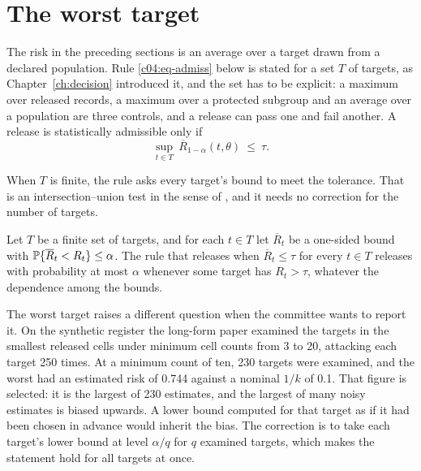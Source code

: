 \section{The worst target}

The risk in the preceding sections is an average over a target drawn from a declared
population. Rule \eqref{c04:eq-admiss} below is stated for a set $T$ of targets, as
Chapter~\ref{ch:decision} introduced it, and the set has to be explicit: a maximum over released
records, a maximum over a protected subgroup and an average over a population are three
controls, and a release can pass one and fail another. A release is statistically
admissible only if
\begin{equation}\label{c04:eq-admiss}
\sup_{t \in T}\ \overline{R}_{1-\alpha}(t,\theta) \ \le\ \tau .
\end{equation}

When $T$ is finite, the rule asks every target's bound to meet the tolerance. That is an
intersection--union test in the sense of \citet{berger1982}, and it needs no correction
for the number of targets.

\begin{proposition}\label{c04:prop-iut}
Let $T$ be a finite set of targets, and for each $t \in T$ let $\overline{R}_t$ be a
one-sided bound with $\mathbb{P}\{\overline{R}_t < R_t\} \le \alpha$. The rule that releases
when $\overline{R}_t \le \tau$ for every $t \in T$ releases with probability at most
$\alpha$ whenever some target has $R_t > \tau$, whatever the dependence among the bounds.
\end{proposition}

The worst target raises a different question when the committee wants to report it. On
the synthetic register the long-form paper examined the targets in the smallest released
cells under minimum cell counts from 3 to 20, attacking each target 250 times. At a
minimum count of ten, 230 targets were examined, and the worst had an estimated risk of
0.744 against a nominal $1/k$ of 0.1.
That figure is selected: it is the largest of 230 estimates, and the largest of many
noisy estimates is biased upwards. A lower bound computed for that target as if it had
been chosen in advance would inherit the bias. The correction is to take each target's
lower bound at level $\alpha/q$ for $q$ examined targets, which makes the statement hold
for all targets at once.

